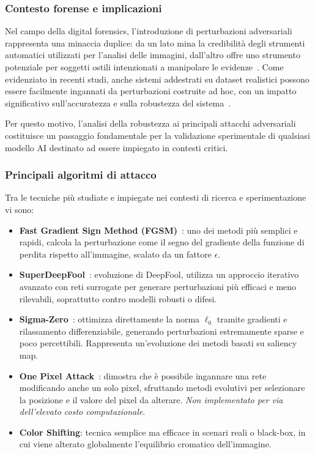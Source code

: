 \subsubsection*{Contesto forense e implicazioni}

Nel campo della digital forensics, l’introduzione di perturbazioni adversariali rappresenta una minaccia duplice: da un lato mina la credibilità degli strumenti automatici utilizzati per l’analisi delle immagini, dall’altro offre uno strumento potenziale per soggetti ostili intenzionati a manipolare le evidenze~\cite{nowroozi2020phd}. Come evidenziato in recenti studi, anche sistemi addestrati su dataset realistici possono essere facilmente ingannati da perturbazioni costruite ad hoc, con un impatto significativo sull’accuratezza e sulla robustezza del sistema~\cite{costantini2019digital, barni2018cf}.

Per questo motivo, l’analisi della robustezza ai principali attacchi adversariali costituisce un passaggio fondamentale per la validazione sperimentale di qualsiasi modello AI destinato ad essere impiegato in contesti critici.


\subsubsection*{Principali algoritmi di attacco}

Tra le tecniche più studiate e impiegate nei contesti di ricerca e sperimentazione vi sono:

\begin{itemize}
    \item \textbf{Fast Gradient Sign Method (FGSM)}~\cite{goodfellow2015explaining}: uno dei metodi più semplici e rapidi, calcola la perturbazione come il segno del gradiente della funzione di perdita rispetto all’immagine, scalato da un fattore $\epsilon$.
    \item \textbf{SuperDeepFool}~\cite{zajac2020superdeepfool}: evoluzione di DeepFool, utilizza un approccio iterativo avanzato con reti surrogate per generare perturbazioni più efficaci e meno rilevabili, soprattutto contro modelli robusti o difesi.
    \item \textbf{Sigma-Zero}~\cite{zhao2024sigmazero}: ottimizza direttamente la norma $\ell_0$ tramite gradienti e rilassamento differenziabile, generando perturbazioni estremamente sparse e poco percettibili. Rappresenta un'evoluzione dei metodi basati su saliency map.
    \item \textbf{One Pixel Attack}~\cite{su2019onepixel}: dimostra che è possibile ingannare una rete modificando anche un solo pixel, sfruttando metodi evolutivi per selezionare la posizione e il valore del pixel da alterare. \textit{Non implementato per via dell’elevato costo computazionale}.
    \item \textbf{Color Shifting}: tecnica semplice ma efficace in scenari reali o black-box, in cui viene alterato globalmente l'equilibrio cromatico dell'immagine.
\end{itemize}

